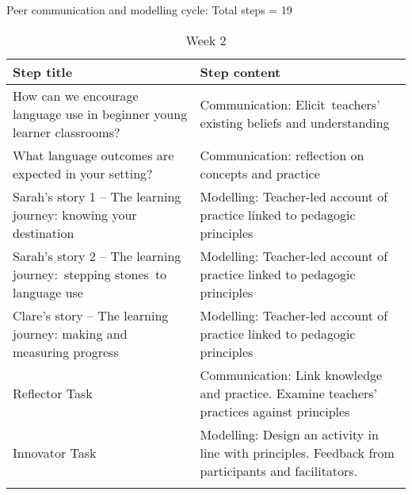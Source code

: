 \documentclass[output=paper]{langscibook}
\begin{document}
\begin{table}
\ContinuedFloat
\caption{Peer communication and modelling cycle: Total steps = 19}
\begin{subtable}{\textwidth}
\caption{Week 2}
\label{tab:porter:4b}
\begin{tabularx}{\textwidth}{QQ}
\lsptoprule
{Step title} & {Step content}\\
\midrule
How can we encourage language use in beginner young learner classrooms? &  Communication: Elicit~teachers’ existing beliefs and understanding~\\
\tablevspace
 What language outcomes are expected in your setting? &  Communication: reflection on concepts and practice\\
 \tablevspace
 Sarah's story 1 -- The learning journey: knowing your destination &  Modelling: Teacher-led account of practice linked to pedagogic principles~\\
 \tablevspace
 Sarah's story 2 -- The learning journey:~stepping stones~to language use &  Modelling: Teacher-led account of practice linked to pedagogic principles~\\
 \tablevspace
 Clare's story -- The learning journey: making and measuring progress &  Modelling: Teacher-led account of practice linked to pedagogic principles~\\
 \tablevspace
 Reflector Task & Communication: Link knowledge and practice. Examine teachers’ practices against principles~\\
 \tablevspace
 Innovator Task & Modelling: Design an activity in line with principles. Feedback from participants and facilitators. \\
\lspbottomrule
\end{tabularx}
\end{subtable}
\end{table}
\end{document}
